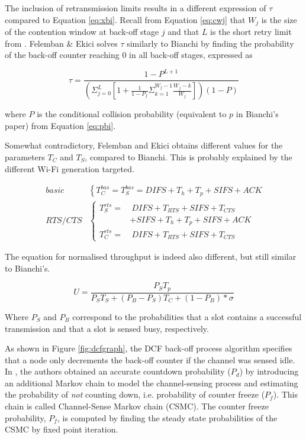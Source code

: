 The inclusion of retransmission limits results in a different expression of
$\tau$ compared to Equation \ref{eq:xbi}. Recall from Equation \ref{eq:cwj}
that $W_j$ is the size of the contention window at back-off stage $j$ and that
$L$ is the short retry limit from \cite{654749}. Felemban \& Ekici solves
$\tau$ similarly to Bianchi \cite{bianchi} by finding the probability of the
back-off counter reaching 0 in all back-off stages, expressed as

\begin{equation} \label{eq:xfe}
	\tau = \frac{1-P^{L+1}}{
		(\Sigma^L_{j=0}
			[1 + \frac{1}{1-P_f}
				\Sigma^{W_j-1}_{k=1} \frac{W_j-k}{W_j}
			]
		)(1-P)}
\end{equation}

where $P$ is the conditional collision probability (equivalent to $p$ in
Bianchi's paper) from Equation \ref{eq:pbi}.

Somewhat contradictory, Felemban and Ekici obtains different values for the
parameters $T_C$ and $T_S$, compared to Bianchi. This is probably explained by
the different Wi-Fi generation targeted.

\begin{align}  \label{eq:tfe}
	\mathit{basic} & \left\{
	        T^{bas}_{C} = T^{bas}_{S} = \mathit{DIFS} + T_h + T_p + \mathit{SIFS} + \mathit{ACK}
	\right. \\
	\mathit{RTS/CTS} & \left\{
	    \begin{aligned}
	        T^{rts}_{S} = & ~ \mathit{DIFS} + T_\mathit{RTS} + \mathit{SIFS} + T_\mathit{CTS} \\ & + \mathit{SIFS} + T_h + T_p + \mathit{SIFS} + \mathit{ACK}  \\
	        T^{rts}_{C} = & ~ \mathit{DIFS} + T_\mathit{RTS} + \mathit{SIFS} + T_\mathit{CTS}
	    \end{aligned}
	\right.
\end{align}

The equation for normalised throughput is indeed also different, but still similar to Bianchi's.

\begin{equation} \label{eq:ufe}
	U = \frac{P_S T_p}{P_S T_S + (P_B - P_S)T_C + (1 - P_B) * \sigma}
\end{equation}

Where $P_S$ and $P_B$ correspond to the probabilities that a slot contains a
successful transmission and that a slot is sensed busy, respectively.

As shown in Figure \ref{fig:dcfgraph}, the DCF back-off process algorithm
specifies that a node only decrements the back-off counter if the channel was
sensed idle. In \cite{felemban}, the authors obtained an accurate countdown
probability ($P_d$) by introducing an additional Markov chain to model the
channel-sensing process and estimating the probability of \emph{not} counting
down, i.e. probability of counter freeze ($P_f$). This chain is called
Channel-Sense Markov chain (CSMC). The counter freeze probability, $P_f$, is
computed by finding the steady state probabilities of the CSMC by fixed point
iteration.

